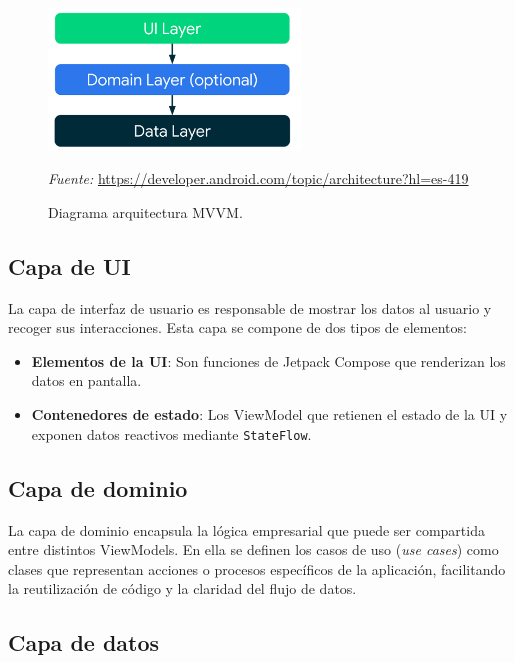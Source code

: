 \begin{figure}[H]
\centering
\includegraphics[width=0.6\textwidth]{./img/mvvm.png}
\caption{Diagrama arquitectura MVVM.}
\label{fig:mvvm}
\vspace{0.2em}
{\footnotesize \centering \textit{Fuente:} \url{https://developer.android.com/topic/architecture?hl=es-419} \par}
\end{figure}

\subsection{Capa de UI}

La capa de interfaz de usuario es responsable de mostrar los datos al usuario y recoger sus interacciones. Esta capa se compone de dos tipos de elementos:

\begin{itemize}
    \item \textbf{Elementos de la UI}: Son funciones de Jetpack Compose que renderizan los datos en pantalla.
    \item \textbf{Contenedores de estado}: Los ViewModel que retienen el estado de la UI y exponen datos reactivos mediante \texttt{StateFlow}.
\end{itemize}

\subsection{Capa de dominio}

La capa de dominio encapsula la lógica empresarial que puede ser compartida entre distintos ViewModels. En ella se definen los casos de uso (\textit{use cases}) como clases que representan acciones o procesos específicos de la aplicación, facilitando la reutilización de código y la claridad del flujo de datos.

\subsection{Capa de datos}

